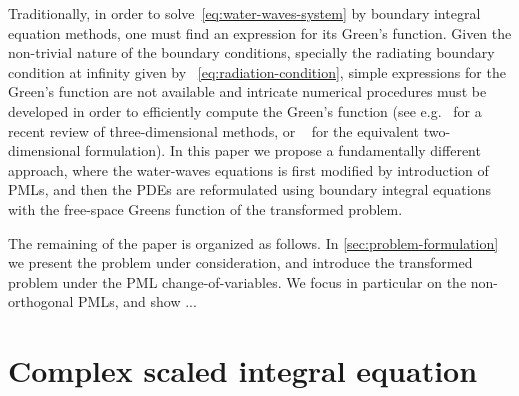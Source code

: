 \documentclass[11pt]{article}
\newcommand{\bn}{\mathbf{n}}
\newcommand{\bx}{\mathbf{x}}
\newcommand{\btau}{\boldsymbol{\tau}}
\newcommand{\by}{\mathbf{y}}
\newcommand{\de}{\,\mathrm{d}}
\newcommand{\tvarphi}{\tilde \varphi}
\begin{document}
Traditionally, in order to solve~\cref{eq:water-waves-system} by boundary
integral equation methods, one must find an expression for its Green's function.
Given the non-trivial nature of the boundary conditions, specially the radiating
boundary condition at infinity given by ~\cref{eq:radiation-condition}, simple
expressions for the Green's function are not available and intricate numerical
procedures must be developed in order to efficiently compute the Green's
function (see e.g.~\cite{xie2018comparison} for a recent review of
three-dimensional methods, or ~\cite{mackay2021green} for the equivalent
two-dimensional formulation). In this paper we propose a fundamentally different
approach, where the water-waves equations is first modified by introduction of
PMLs, and then the PDEs are reformulated using boundary integral equations with
the free-space Greens function of the transformed problem. 


The remaining of the paper is organized as follows. In
\cref{sec:problem-formulation} we present the problem under consideration, and
introduce the transformed problem under the PML change-of-variables. We focus in
particular on the non-orthogonal PMLs, and show ...

\section{Complex scaled integral equation}
\end{document}
